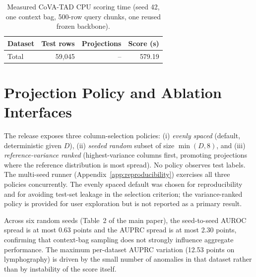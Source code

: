 \documentclass{article}
\begin{document}
\begin{table}[h]
\centering
\caption{Measured CoVA-TAD CPU scoring time (seed 42, one context bag, 500-row query chunks, one reused frozen backbone).}
\label{tab:cova-runtime}
\small
\setlength{\tabcolsep}{8pt}
\begin{tabular}{lrrr}
\toprule
Dataset & Test rows & Projections & Score (s)\\
\midrule
%
Total & 59{,}045 & -- & 579.19\\
\bottomrule
\end{tabular}
\end{table}

\section{Projection Policy and Ablation Interfaces}
\label{app:ablations}

The release exposes three column-selection policies: (i) \emph{evenly spaced} (default, deterministic given $D$), (ii) \emph{seeded random} subset of size $\min(D, 8)$, and (iii) \emph{reference-variance ranked} (highest-variance columns first, promoting projections where the reference distribution is most spread). No policy observes test labels. The multi-seed runner (Appendix~\ref{app:reproducibility}) exercises all three policies concurrently. The evenly spaced default was chosen for reproducibility and for avoiding test-set leakage in the selection criterion; the variance-ranked policy is provided for user exploration but is not reported as a primary result.

Across six random seeds (Table~2 of the main paper), the seed-to-seed AUROC spread is at most 0.63 points and the AUPRC spread is at most 2.30 points, confirming that context-bag sampling does not strongly influence aggregate performance. The maximum per-dataset AUPRC variation (12.53 points on lymphography) is driven by the small number of anomalies in that dataset rather than by instability of the score itself.
\end{document}
